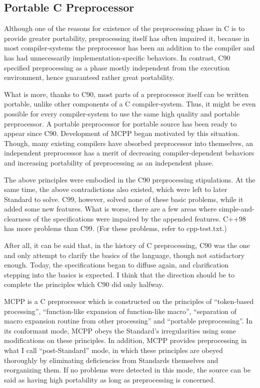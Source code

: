 \documentclass[twocolumn]{article}
\begin{document}
\subsection{Portable C Preprocessor}

Although one of the reasons for existence of the preprocessing phase in C is to provide greater portability, preprocessing itself has often impaired it, because in most compiler-systems the preprocessor has been an addition to the compiler and has had unnecessarily implementation-specific behaviors.  In contrast, C90 specified preprocessing as a phase mostly independent from the execution environment, hence guaranteed rather great portability.

What is more, thanks to C90, most parts of a preprocessor itself can be written portable, unlike other components of a C compiler-system.  Thus, it might be even possible for every compiler-system to use the same high quality and portable preprocessor.  A portable preprocessor for portable source has been ready to appear since C90.  Development of MCPP began motivated by this situation.  Though, many existing compilers have absorbed preprocessor into themselves, an independent preprocessor has a merit of decreasing compiler-dependent behaviors and increasing portability of preprocessing as an independent phase.

The above principles were embodied in the C90 preprocessing stipulations.  At the same time, the above contradictions also existed, which were left to later Standard to solve.  C99, however, solved none of these basic problems, while it added some new features.  What is worse, there are a few areas where simple-and-clearness of the specifications were impaired by the appended features.  C++98 has more problems than C99. (For these problems, refer to cpp-test.txt.)

After all, it can be said that, in the history of C preprocessing, C90 was the one and only attempt to clarify the basics of the language, though not satisfactory enough.  Today, the specifications began to diffuse again, and clarification stepping into the basics is expected.  I think that the direction should be to complete the principles which C90 did only halfway.

MCPP is a C preprocessor which is constructed on the principles of ``token-based processing'', ``function-like expansion of function-like macro'', ``separation of macro expansion routine from other processing'' and ``portable preprocessing''.  In its conformant mode, MCPP obeys the Standard's irregularities using some modifications on these principles.  In addition, MCPP provides preprocessing in what I call ``post-Standard'' mode, in which these principles are obeyed thoroughly by eliminating deficiencies from Standards themselves and reorganizing them.  If no problems were detected in this mode, the source can be said as having high portability as long as preprocessing is concerned.
\end{document}
